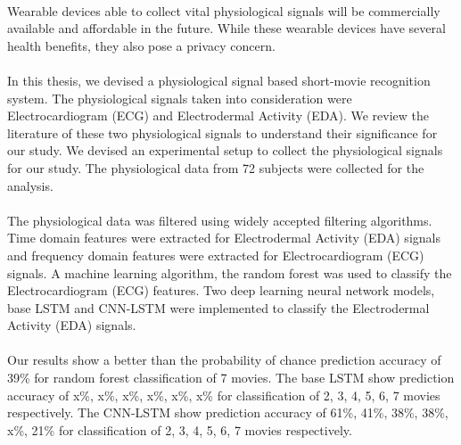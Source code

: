 \paragraph{}
Wearable devices able to collect vital physiological signals will be commercially available and affordable in the future. While these wearable devices have several health benefits, they also pose a privacy concern.
\paragraph{}
In this thesis, we devised a physiological signal based short-movie recognition system. The physiological signals taken into consideration were Electrocardiogram (ECG) and Electrodermal Activity (EDA). We review the literature of these two physiological signals to understand their significance for our study. We devised an experimental setup to collect the physiological signals for our study. The physiological data from 72 subjects were collected for the analysis.
\paragraph{}
The physiological data was filtered using widely accepted filtering algorithms. Time domain features were extracted for Electrodermal Activity (EDA) signals and frequency domain features were extracted for Electrocardiogram (ECG) signals. A machine learning algorithm, the random forest was used to classify the Electrocardiogram (ECG) features. Two deep learning neural network models, base LSTM and CNN-LSTM were implemented to classify the Electrodermal Activity (EDA) signals.
\paragraph{}
Our results show a better than the probability of chance prediction accuracy of 39\% for random forest classification of 7 movies. The base LSTM show prediction accuracy of x\%, x\%, x\%, x\%, x\%, x\% for classification of 2, 3, 4, 5, 6, 7 movies respectively. The CNN-LSTM show prediction accuracy of 61\%, 41\%, 38\%, 38\%, x\%, 21\%  for classification of 2, 3, 4, 5, 6, 7 movies respectively. 
